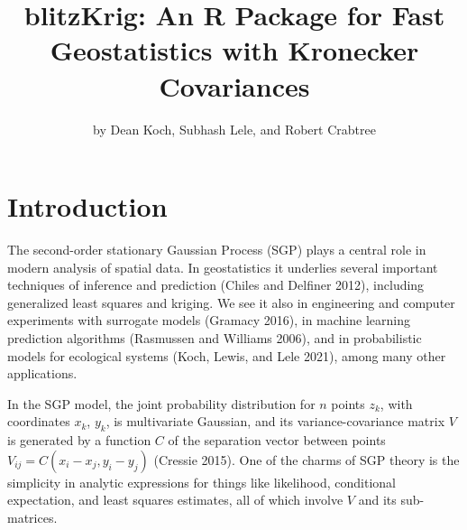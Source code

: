 \title{blitzKrig: An R Package for Fast Geostatistics with Kronecker Covariances}
\author{by Dean Koch, Subhash Lele, and Robert Crabtree}

\maketitle


\hypertarget{introduction}{%
\section{Introduction}\label{introduction}}

The second-order stationary Gaussian Process (SGP) plays a central role in modern analysis of spatial data. In geostatistics it underlies several important techniques of inference and prediction (Chiles and Delfiner 2012), including generalized least squares and kriging. We see it also in engineering and computer experiments with surrogate models (Gramacy 2016), in machine learning prediction algorithms (Rasmussen and Williams 2006), and in probabilistic models for ecological systems (Koch, Lewis, and Lele 2021), among many other applications.

In the SGP model, the joint probability distribution for \(n\) points \(z_k\), with coordinates \(x_k\), \(y_k\), is multivariate Gaussian, and its variance-covariance matrix \(V\) is generated by a function \(C\) of the separation vector between points \(V_{ij} = C ( x_i - x_j, y_i - y_j )\) (Cressie 2015). One of the charms of SGP theory is the simplicity in analytic expressions for things like likelihood, conditional expectation, and least squares estimates, all of which involve \(V\) and its sub-matrices.

